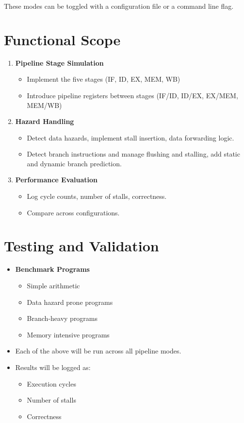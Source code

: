 \documentclass{report}
\begin{document}
These modes can be toggled with a configuration file or a command line flag.

\section{Functional Scope}
\begin{enumerate}
    \item \textbf{Pipeline Stage Simulation}
    \begin{itemize}
        \item Implement the five stages (IF, ID, EX, MEM, WB)
        \item Introduce pipeline registers between stages (IF/ID, ID/EX, EX/MEM, MEM/WB)
    \end{itemize}

    \item \textbf{Hazard Handling}
    \begin{itemize}
        \item Detect data hazards, implement stall insertion, data forwarding logic.
        \item Detect branch instructions and manage flushing and stalling, add static and dynamic branch prediction.
    \end{itemize}

    \item \textbf{Performance Evaluation}
    \begin{itemize}
        \item Log cycle counts, number of stalls, correctness.
        \item Compare across configurations.
    \end{itemize}    
\end{enumerate}

\section{Testing and Validation}
\begin{itemize}
    \item \textbf{Benchmark Programs}
    \begin{itemize}
        \item Simple arithmetic
        \item Data hazard prone programs
        \item Branch-heavy programs
        \item Memory intensive programs
    \end{itemize}

    \item Each of the above will be run across all pipeline modes.
    
    \item Results will be logged as:
    \begin{itemize}
        \item Execution cycles
        \item Number of stalls
        \item Correctness
    \end{itemize}
\end{itemize}
\end{document}
